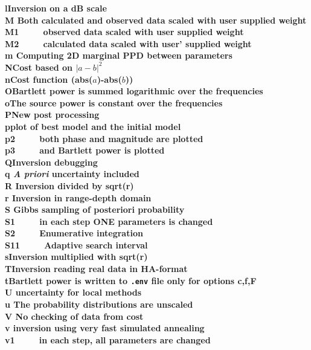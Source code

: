 \begin{tabbing}
\bf l\>Inversion on a dB scale\\
\bf M \>Both calculated and observed data scaled with user supplied weight\\ 
\bf M1\>~~~~~observed data scaled with user supplied weight\\
\bf M2\>~~~~~calculated data scaled with user' supplied weight\\ 
\bf m \>Computing 2D marginal PPD between parameters\\ 
\bf N\>Cost based on $|a-b|^2$\\
\bf n\>Cost function (abs($a$)-abs($b$))\\
\bf O\>Bartlett power is summed logarithmic over the frequencies\\
\bf o\>The source power is constant over the frequencies\\
\bf P\>New post processing\\
\bf p\>plot of best model and the initial model\\
\bf p2\>~~~~~both phase and magnitude are plotted\\ 
\bf p3\>~~~~~and Bartlett power is plotted\\
\bf Q\>Inversion debugging\\
\bf q\> {\it A priori}  uncertainty included\\
\bf R\> Inversion  divided by sqrt(r)\\
\bf r\> Inversion in range-depth domain\\      
\bf S\> Gibbs sampling of posteriori probability\\
\bf S1\>~~~~~in each step ONE parameters is changed\\ 
\bf S2\>~~~~~Enumerative integration\\
\bf S11\>~~~~~Adaptive search interval\\ 
\bf s\>Inversion multiplied with sqrt(r) \\
\bf T\>Inversion reading real data in HA-format\\  
\bf t\>Bartlett power is written to {\tt *.env} file only for options c,f,F\\
\bf U\> uncertainty for local methods \\
\bf u\> The probability distributions are unscaled\\
\bf V\> No checking of data from cost\\
\bf v\> inversion using very fast simulated annealing\\
\bf v1\>~~~~~in each step, all parameters are changed\\ 

\end{tabbing}
